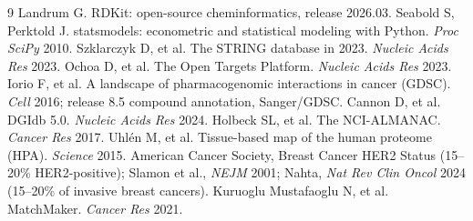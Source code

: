 \documentclass[11pt]{article}
\begin{document}
\begin{thebibliography}{9}
 Landrum G. RDKit: open-source cheminformatics, release 2026.03.
 Seabold S, Perktold J. statsmodels: econometric and statistical modeling with Python. \emph{Proc SciPy} 2010.
 Szklarczyk D, et al. The STRING database in 2023. \emph{Nucleic Acids Res} 2023.
 Ochoa D, et al. The Open Targets Platform. \emph{Nucleic Acids Res} 2023.
 Iorio F, et al. A landscape of pharmacogenomic interactions in cancer (GDSC). \emph{Cell} 2016; release 8.5 compound annotation, Sanger/GDSC.
 Cannon D, et al. DGIdb 5.0. \emph{Nucleic Acids Res} 2024.
 Holbeck SL, et al. The NCI-ALMANAC. \emph{Cancer Res} 2017.
 Uhl\'en M, et al. Tissue-based map of the human proteome (HPA). \emph{Science} 2015.
 American Cancer Society, Breast Cancer HER2 Status (15--20\% HER2-positive); Slamon et al., \emph{NEJM} 2001; Nahta, \emph{Nat Rev Clin Oncol} 2024 (15--20\% of invasive breast cancers).
 Kuruoglu Mustafaoglu N, et al. MatchMaker. \emph{Cancer Res} 2021.
\end{thebibliography}




\end{document}
